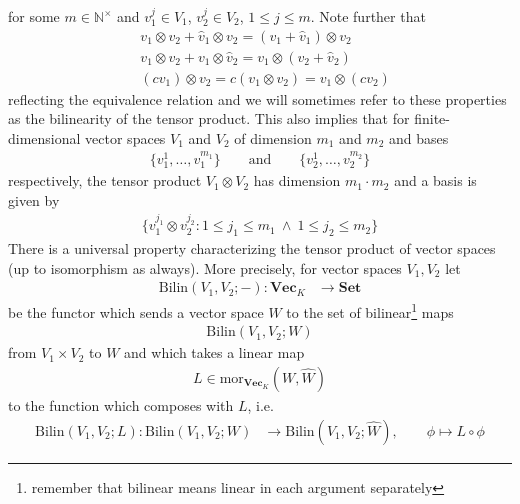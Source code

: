 for some $m \in \mathbb{N}^{\times}$ and $v_{1}^{j} \in V_{1}$, $v_{2}^{j} \in V_{2}$, $1 \leq j \leq m$. Note further that
\begin{align*}
  &
  v_{1}
  \otimes
  v_{2}
  +
  \hat{v}_{1}
  \otimes
  v_{2}
  =
  (v_{1} + \hat{v}_{1})
  \otimes
  v_{2}
  \\
  &
  v_{1}
  \otimes
  v_{2}
  +
  v_{1}
  \otimes
  \hat{v}_{2}
  =
  v_{1}
  \otimes
  (v_{2} + \hat{v}_{2})
  \\
  &
  (cv_{1})
  \otimes
  v_{2}
  =
  c
  (v_{1} \otimes v_{2})
  =
  v_{1}
  \otimes
  (cv_{2})
\end{align*}
reflecting the equivalence relation and we will sometimes refer to these properties as the {\glqq}bilinearity of the tensor product{\grqq}. This also implies that for finite-dimensional vector spaces $V_{1}$ and $V_{2}$ of dimension $m_{1}$ and $m_{2}$ and bases
\begin{align*}
  \lbrace
    v_{1}^{1}
    ,
    \ldots
    ,
    v_{1}^{m_{1}}
  \rbrace
  \qquad
  \text{and}
  \qquad
  \lbrace
    v_{2}^{1}
    ,
    \ldots
    ,
    v_{2}^{m_{2}}
  \rbrace
\end{align*}
respectively, the tensor product $V_{1} \otimes V_{2}$ has dimension $m_{1} \cdot m_{2}$ and a basis is given by
\begin{align*}
  \lbrace
    v_{1}^{j_{1}}
    \otimes
    v_{2}^{j_{2}}
    \colon
    1
    \leq
    j_{1}
    \leq
    m_{1}
    \ 
    \land
    \ 
    1
    \leq
    j_{2}
    \leq
    m_{2}
  \rbrace
\end{align*}
There is a universal property characterizing the tensor product of vector spaces (up to isomorphism as always). More precisely, for vector spaces $V_{1},V_{2}$ let
\begin{align*}
  \mathrm{Bilin}(V_{1},V_{2};-)
  \colon
  \mathbf{Vec}_{K}
  &\to
  \mathbf{Set}
\end{align*}
be the functor which sends a vector space $W$ to the set of bilinear\footnote{remember that bilinear means linear in each argument separately} maps
\begin{align*}
  \mathrm{Bilin}(V_{1},V_{2};W)
\end{align*}
from $V_{1} \times V_{2}$ to $W$ and which takes a linear map
\begin{align*}
  L
  \in
  \mathrm{mor}_{\mathbf{Vec}_{K}}
  \left(
    W
    ,
    \hat{W}
  \right)
\end{align*}
to the function which composes with $L$, i.e.
\begin{align*}
  \mathrm{Bilin}(V_{1},V_{2};L)
  \colon
  \mathrm{Bilin}(V_{1},V_{2};W)
  &\to
  \mathrm{Bilin}(V_{1},V_{2};\hat{W})
  ,\qquad
  \phi
  \mapsto
  L
  \circ
  \phi
\end{align*}
